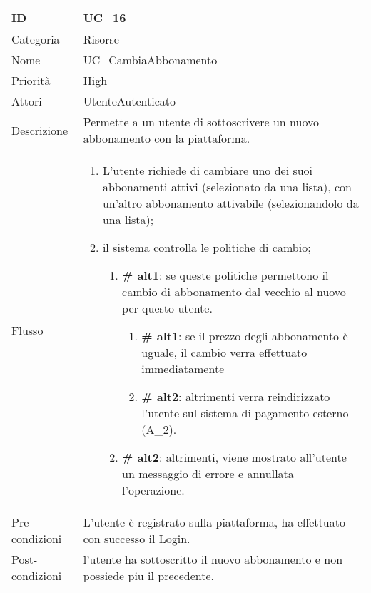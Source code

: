 \begin{center}
\begin{tabular}{ |p{2cm}|p{13cm}|  }
\hline
ID & UC\_16 \\\hline
Categoria & Risorse\\\hline
Nome & UC\_CambiaAbbonamento\\\hline
Priorità & High \\\hline
Attori &  UtenteAutenticato \\\hline
Descrizione & Permette a un utente di sottoscrivere un nuovo abbonamento con la piattaforma.\\\hline
Flusso &  	\begin{enumerate}
			\item L'utente richiede di cambiare uno dei suoi abbonamenti attivi (selezionato da una lista), con un'altro abbonamento attivabile (selezionandolo da una lista);
			\item il sistema controlla le politiche di cambio;
			\begin{enumerate}[  ]
				\item \textbf{\# alt1}: se queste politiche permettono il cambio di abbonamento dal vecchio al nuovo per questo utente.
				\begin{enumerate}[label=\arabic*]
					\item \textbf{\# alt1}: se il prezzo degli abbonamento è uguale, il cambio verra effettuato immediatamente
					\item \textbf{\# alt2}: altrimenti verra reindirizzato l'utente sul sistema di pagamento esterno (A\_2).
				\end{enumerate}
				\item \textbf{\# alt2}: altrimenti, viene mostrato all'utente un messaggio di errore e annullata l'operazione.
			\end{enumerate}
			\end{enumerate}\\\hline
Pre-condizioni & L'utente è registrato sulla piattaforma, ha effettuato con successo il Login.\\\hline
Post-condizioni &  l'utente ha sottoscritto il nuovo abbonamento e non possiede piu il precedente.\\\hline
\end{tabular}
\label{table_use_case:16}\newline


\end{center}
